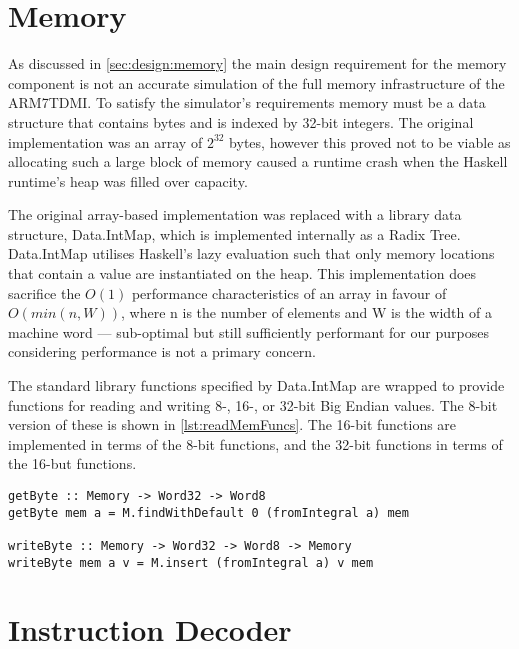 
\section{Memory}
\label{sec:implementation:memory}

As discussed in \autoref{sec:design:memory} the main design requirement for the memory component is not an accurate simulation of the full memory infrastructure of the ARM7TDMI. To satisfy the simulator's requirements memory must be a data structure that contains bytes and is indexed by 32-bit integers. The original implementation was an array of $2^{32}$ bytes, however this proved not to be viable as allocating such a large block of memory caused a runtime crash when the Haskell runtime's heap was filled over capacity.

The original array-based implementation was replaced with a library data structure, Data.IntMap, which is implemented internally as a Radix Tree. Data.IntMap utilises Haskell's lazy evaluation such that only memory locations that contain a value are instantiated on the heap. This implementation does sacrifice the $O(1)$ performance characteristics of an array in favour of $O(min(n,W))$, where n is the number of elements and W is the width of a machine word --- sub-optimal but still sufficiently performant for our purposes considering performance is not a primary concern.

The standard library functions specified by Data.IntMap are wrapped to provide functions for reading and writing 8-, 16-, or 32-bit Big Endian values. The 8-bit version of these is shown in \autoref{lst:readMemFuncs}. The 16-bit functions are implemented in terms of the 8-bit functions, and the 32-bit functions in terms of the 16-but functions.

\begin{lstlisting}[mathescape,numbers=none,caption={The read and write Memory functions},label={lst:readMemFuncs}]
getByte :: Memory -> Word32 -> Word8
getByte mem a = M.findWithDefault 0 (fromIntegral a) mem

writeByte :: Memory -> Word32 -> Word8 -> Memory
writeByte mem a v = M.insert (fromIntegral a) v mem
\end{lstlisting}


\section{Instruction Decoder}
\label{sec:decoder}

